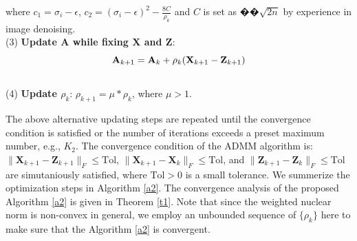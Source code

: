 \documentclass[10pt,twocolumn,letterpaper,sort&compress]{article}
\begin{document}
where $c_{1}=\sigma_{i}-\epsilon$, $c_{2} = (\sigma_{i}-\epsilon)^{2}-\frac{8C}{\rho_{k}}$ and $C$ is set as $��
\sqrt{2n}$ by experience in image denoising.
 \\
(3) \textbf{Update $\mathbf{A}$ while fixing $\mathbf{X}$ and $\mathbf{Z}$}:
\vspace{-3mm}
\begin{equation}
\label{e18}
\vspace{-7mm}
\mathbf{A}_{k+1}
=
\mathbf{A}_{k} + \rho_{k}(\mathbf{X}_{k+1}-\mathbf{Z}_{k+1})
\end{equation}
\\
(4) \textbf{Update $\rho_{k}$}: $\rho_{k+1}= \mu * \rho_{k}$, where $\mu>1$.

The above alternative updating steps are repeated until the convergence condition is satisfied or the number of iterations exceeds a preset maximum number, e.g., $K_{2}$. The convergence condition of the ADMM algorithm is: $\|\mathbf{X}_{k+1}-\mathbf{Z}_{k+1}\|_{F}\le \text{Tol}$, $\|\mathbf{X}_{k+1}-\mathbf{X}_{k}\|_{F}\le \text{Tol}$, and $\|\mathbf{Z}_{k+1}-\mathbf{Z}_{k}\|_{F}\le \text{Tol}$ are simutaniously satisfied, where $\text{Tol}>0$ is a small tolerance. We summerize the optimization steps in Algorithm \ref{a2}. The convergence analysis of the proposed Algorithm \ref{a2} is given in Theorem \ref{t1}. Note that since the weighted nuclear norm is non-convex in general, we employ an unbounded sequence of $\{\rho_{k}\}$ here to make sure that the Algorithm \ref{a2} is convergent. 
\end{document}
